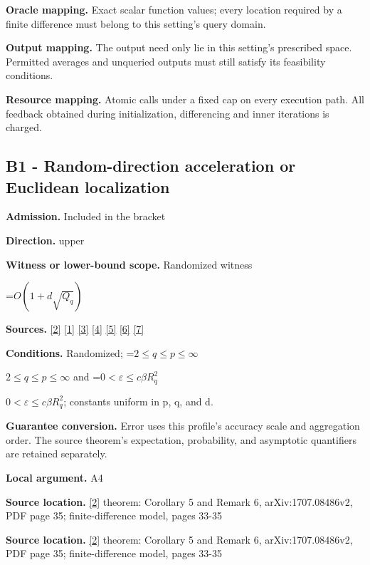 \documentclass[10pt,a4paper]{article}
\newcommand{\AtlasMath}[1]{\par\begingroup\centering\setbox0=\hbox{$\displaystyle #1$}\ifdim\wd0>1.4\linewidth\typeout{ATLAS WIDE FORMULA: \the\wd0}\fi\ifdim\wd0>\linewidth\resizebox{\linewidth}{!}{\box0}\else\box0\fi\par\endgroup}
\newcommand{\AtlasInlineMath}[1]{\begingroup\setbox0=\hbox{$#1$}\ifdim\wd0>.4\linewidth\endgroup\AtlasMath{#1}\else\endgroup$#1$\fi}
\begin{document}
\textbf{Oracle mapping.} Exact scalar function values; every location required by a finite difference must belong to this setting's query domain.

\textbf{Output mapping.} The output need only lie in this setting's prescribed space. Permitted averages and unqueried outputs must still satisfy its feasibility conditions.

\textbf{Resource mapping.} Atomic calls under a fixed cap on every execution path. All feedback obtained during initialization, differencing and inner iterations is charged.

\subsection{B1 - Random-direction acceleration or Euclidean localization}
\textbf{Admission.} Included in the bracket

\textbf{Direction.} upper

\textbf{Witness or lower-bound scope.} Randomized witness

\AtlasMath{O(1+d\sqrt{Q_q})}
\textbf{Sources.} \href{https://arxiv.org/pdf/1707.08486v2}{[2]} \href{https://arxiv.org/html/2610.00345v1}{[1]} \href{https://arxiv.org/html/2607.16558v2}{[3]} \href{https://www.mathnet.ru/php/archive.phtml?jrnid=mzm&option_lang=eng&paperid=1697&wshow=paper}{[4]} \href{https://arxiv.org/abs/1802.09022}{[5]} \href{https://proceedings.neurips.cc/paper_files/paper/2022/file/329ef22fd8cb68223d5df09a037f7dd9-Paper-Conference.pdf}{[6]} \href{https://jmlr.org/papers/volume18/16-632/16-632.pdf}{[7]}

\textbf{Conditions.} Randomized; \AtlasInlineMath{2\le q\le p\le\infty} and \AtlasInlineMath{0<\varepsilon\le c\beta R_q^2}; constants uniform in p, q, and d.

\textbf{Guarantee conversion.} Error uses this profile's accuracy scale and aggregation order. The source theorem's expectation, probability, and asymptotic quantifiers are retained separately.

\textbf{Local argument.} A4

\textbf{Source location.} \href{https://arxiv.org/pdf/1707.08486v2}{[2]} theorem: Corollary 5 and Remark 6, arXiv:1707.08486v2, PDF page 35; finite-difference model, pages 33-35

\textbf{Source location.} \href{https://arxiv.org/pdf/1707.08486v2}{[2]} theorem: Corollary 5 and Remark 6, arXiv:1707.08486v2, PDF page 35; finite-difference model, pages 33-35
\end{document}
